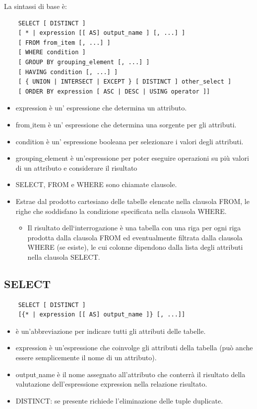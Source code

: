 \documentclass[a4paper]{article}
\begin{document}
La sintassi di base è:
\begin{verbatim}
    SELECT [ DISTINCT ]
    [ * | expression [[ AS] output_name ] [, ...] ]
    [ FROM from_item [, ...] ]
    [ WHERE condition ]
    [ GROUP BY grouping_element [, ...] ]
    [ HAVING condition [, ...] ]
    [ { UNION | INTERSECT | EXCEPT } [ DISTINCT ] other_select ]
    [ ORDER BY expression [ ASC | DESC | USING operator ]]
\end{verbatim}
\noindent
\begin{itemize}
    \item expression è un' espressione che determina un attributo.
    \item from$\_$item è un' espressione che determina una sorgente per gli attributi.
    \item condition è un' espressione booleana per selezionare i valori degli attributi.
    \item grouping$\_$element è un’espressione per poter eseguire operazioni su più valori di un attributo e
    considerare il risultato
    \item SELECT, FROM e WHERE sono chiamate clausole.
    \item Estrae dal prodotto cartesiano delle tabelle elencate nella clausola FROM, le righe che soddisfano la
    condizione specificata nella clausola WHERE.
    \begin{itemize}
        \item Il risultato dell‘interrogazione è una tabella con una riga per ogni riga prodotta dalla clausola FROM ed
        eventualmente filtrata dalla clausola WHERE (se esiste), le cui colonne dipendono dalla lista degli attributi
        nella clausola SELECT.
    \end{itemize}
\end{itemize}

\subsection{SELECT}

\begin{verbatim}
    SELECT [ DISTINCT ]
    [{* | expression [[ AS] output_name ]} [, ...]]
\end{verbatim}


\begin{itemize}
    \item è un’abbreviazione per indicare tutti gli attributi delle tabelle.
    \item expression è un’espressione che coinvolge gli attributi della tabella (può anche essere semplicemente
    il nome di un attributo).
    \item output$\_$name è il nome assegnato all’attributo che conterrà il risultato della valutazione
    dell’espressione expression nella relazione risultato.
    \item DISTINCT: se presente richiede l’eliminazione delle tuple duplicate.
\end{itemize}
\end{document}
